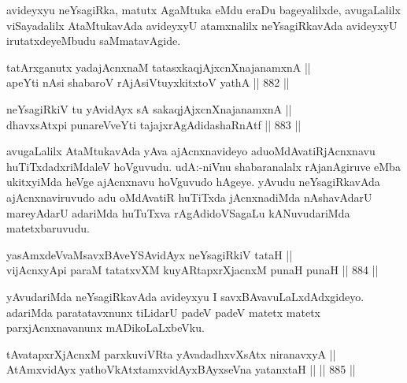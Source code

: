 \begin{artha}
avideyxyu neYsagiRka, matutx AgaMtuka eMdu eraDu bageyalilxde, avugaLalilx viSayadalilx AtaMtukavAda avideyxyU atamxnalilx neYsagiRkavAda avideyxyU irutatxdeyeMbudu saMmatavAgide.
\end{artha}


\begin{shl}
tatArx\s \s ganutx yadajAcnxnaM tatasxkaqjAjxcnXnajanamxnA || \\
apeYti nAsi shabaroV rAjA\s siVtuyxkitxtoV yathA \hfill || 882 ||  
\end{shl}
				
\begin{shl}
neYsagiRkiV tu yA\s vidAyx sA sakaqjAjxcnXnajanamxnA || \\
dhavxsAtx\s pi punareVveYti tajajxrAgAdidashaRnAtf \hfill || 883 ||  
\end{shl}

\begin{artha}
avugaLalilx AtaMtukavAda yAva ajAcnxnavideyo adu\break oMdAvatiRjAcnxnavu huTiTxdadxriMdaleV hoVguvudu. udA:-niVnu shabaranalalx rAjanAgiruve eMba ukitxyiMda heVge ajAcnxnavu hoVguvudo hAgeye. yAvudu neYsagiRkavAda ajAcnxnaviruvudo adu oMdAvatiR huTiTxda jAcnxnadiMda nAshavAdarU mareyAdarU adariMda huTuTxva rAgAdidoVSagaLu kANuvudariMda matetx\break baruvudu.
\end{artha}


\begin{shl}
yasAmxdeVvaMsavxBAveYSA\s vidAyx neYsagiRkiV tataH || \\
vijAcnxyApi paraM tatatxvXM kuyARtapxrXjacnxM punaH punaH \hfill || 884 ||  
\end{shl}

\begin{artha}
yAvudariMda neYsagiRkavAda avideyxyu I savxBAvavuLaLxdAdxgideyo. adariMda paratatavxnunx tiLidarU padeV padeV matetx matetx parxjAcnxnavanunx mADikoLaLxbeVku.
\end{artha}


\begin{shl}
tAvatapxrXjAcnxM parxkuviVRta yAvadadhxvXsAtx niranavxyA || \\
AtAmxvidAyx yathoVkAtxtamxvidAyxBAyxseVna yatanxtaH ||  \hfill || 885 ||  
\end{shl}


